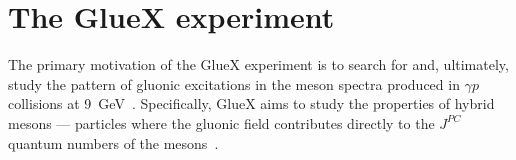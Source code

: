 

\section{The GlueX experiment \label{sec:projectbackground} }

The primary motivation of the GlueX experiment is to search for and, ultimately, study the pattern of gluonic excitations in the meson spectra produced in $\gamma p$ collisions at 9~GeV~\cite{gluex-ref}.
Specifically, GlueX aims to study the properties of hybrid mesons --- particles where the gluonic field contributes directly to the $J^{PC}$ quantum numbers of the mesons~\cite{meyer:2015eta}. 
